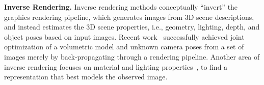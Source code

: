 %
%

\vspace{0.5\baselineskip}
\noindent
\textbf{Inverse Rendering.}
%
Inverse rendering methods conceptually ``invert'' the graphics rendering pipeline, which generates images from 3D scene descriptions, and instead estimates the 3D scene properties, i.e., geometry, lighting, depth, and object poses based on input images. Recent work~\cite{wang2021nerfmm,yen2021inerf,lin2021barf} successfully achieved joint optimization of a volumetric model and unknown camera poses from a set of images merely by back-propagating through a rendering pipeline. Another area of inverse rendering focuses on material and lighting properties~\cite{nimier2021material,guo2022nerfren, NimierDavidVicini2019Mitsuba2}, to find a representation that best models the observed image.

